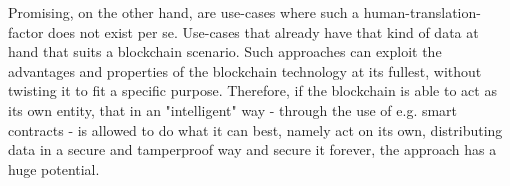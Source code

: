 Promising, on the other hand, are use-cases where such a human-translation-factor does not exist per se. Use-cases that already have that kind of data at hand that suits a blockchain scenario. Such approaches can exploit the advantages and properties of the blockchain technology at its fullest, without twisting it to fit a specific purpose.
Therefore, if the blockchain is able to act as its own entity, that in an "intelligent" way - through the use of e.g. smart contracts - is allowed to do what it can best, namely act on its own, distributing data in a secure and tamperproof way and secure it forever, the approach has a huge potential.
